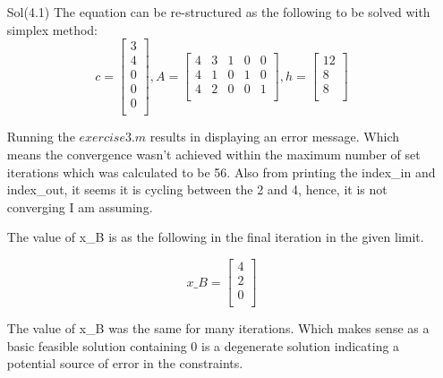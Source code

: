 \documentclass[unicode,11pt,a4paper,oneside,numbers=endperiod,openany]{scrartcl}
\begin{document}
\begin{enumerate}
 \item[Sol(4.1)] The equation can be re-structured as the following to be solved with simplex method:
 \begin{equation*}
  c=\begin{bmatrix}
     3 \\ 4 \\ 0 \\ 0 \\ 0\\
    \end{bmatrix},
    A=\begin{bmatrix}
       4 & 3 & 1 & 0 & 0 \\
       4 & 1 & 0 & 1 & 0 \\
       4 & 2 & 0 & 0 & 1 \\
      \end{bmatrix},
    h=\begin{bmatrix}
       12 \\ 8 \\ 8 \\
      \end{bmatrix}
 \end{equation*}

 Running the ${exercise3.m}$ results in displaying an error message. Which means the convergence wasn't achieved within the maximum number of set iterations which was calculated to be 56. Also from printing the index\_in and index\_out, it seems it is cycling between the 2 and 4, hence, it is not converging I am assuming.\\
 
 \newpage
 
 The value of x\_B is as the following in the final iteration in the given limit.
 
 \begin{center}
  \begin{equation*}
   x\_B=\begin{bmatrix}
         4 \\ 2 \\ 0 \\
        \end{bmatrix}
  \end{equation*}
 \end{center}
 
 The value of x\_B was the same for many iterations. Which makes sense as a basic feasible solution containing 0 is a degenerate solution indicating a potential source of error in the constraints.\\
 

\end{enumerate}
\end{document}
